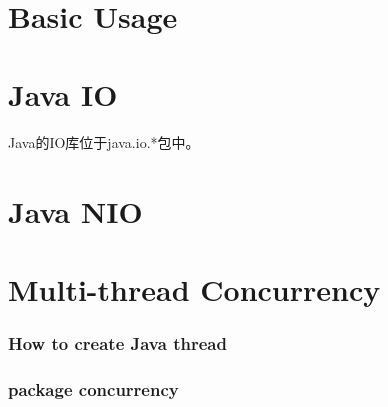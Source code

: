 \documentclass[a4paper,11pt]{article}
\begin{document}
\tt %
\pagestyle{header}
\sybmaketitle
\tableofcontents
\newpage

\pagestyle{main}
\setcounter{page}{1}

\part[Basic Usage]{Basic Usage}














\part[Java IO]{Java IO}
Java的IO库位于java.io.*包中。




\part[Java NIO]{Java NIO}


\part[Multi-thread and Concurrency]{Multi-thread Concurrency}
\section[How to create Java thread]{How to create Java thread}

\section[package: concurrency]{package concurrency}




\end{document}

